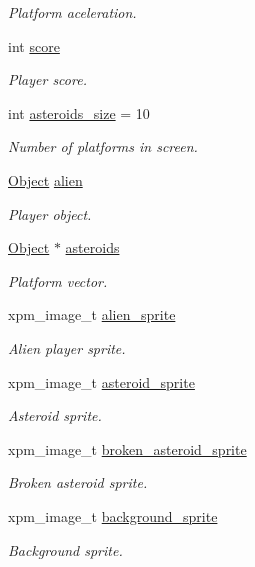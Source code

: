 \begin{DoxyCompactItemize}
\begin{DoxyCompactList}\small\item\em Platform aceleration. \end{DoxyCompactList}\item 
int \hyperlink{group__Game_gaef160b7437d94056f1dc59646cd5b87d}{score}
\begin{DoxyCompactList}\small\item\em Player score. \end{DoxyCompactList}\item 
int \hyperlink{group__Game_gad7f76af8922cce0f1ae4e8c9ed2346bd}{asteroids\+\_\+size} = 10
\begin{DoxyCompactList}\small\item\em Number of platforms in screen. \end{DoxyCompactList}\item 
\hyperlink{structObject}{Object} \hyperlink{group__Game_gab29a895e902e0b5c3ab2064a27af5a2d}{alien}
\begin{DoxyCompactList}\small\item\em Player object. \end{DoxyCompactList}\item 
\hyperlink{structObject}{Object} $\ast$ \hyperlink{group__Game_gae4c148b0e7f64e113a8ef493e7707429}{asteroids}
\begin{DoxyCompactList}\small\item\em Platform vector. \end{DoxyCompactList}\item 
xpm\+\_\+image\+\_\+t \hyperlink{group__Game_ga69acbc91c439d0d9f047cbe70ade84cc}{alien\+\_\+sprite}
\begin{DoxyCompactList}\small\item\em Alien player sprite. \end{DoxyCompactList}\item 
xpm\+\_\+image\+\_\+t \hyperlink{group__Game_ga45f80f61d0103ffc208c2d0493380fb2}{asteroid\+\_\+sprite}
\begin{DoxyCompactList}\small\item\em Asteroid sprite. \end{DoxyCompactList}\item 
xpm\+\_\+image\+\_\+t \hyperlink{group__Game_ga06a70f098733d826cb9d8e81e7104983}{broken\+\_\+asteroid\+\_\+sprite}
\begin{DoxyCompactList}\small\item\em Broken asteroid sprite. \end{DoxyCompactList}\item 
xpm\+\_\+image\+\_\+t \hyperlink{group__Game_ga5a4cfb92e48a82e5d50c87e4bc632970}{background\+\_\+sprite}
\begin{DoxyCompactList}\small\item\em Background sprite. \end{DoxyCompactList}\end{DoxyCompactItemize}



